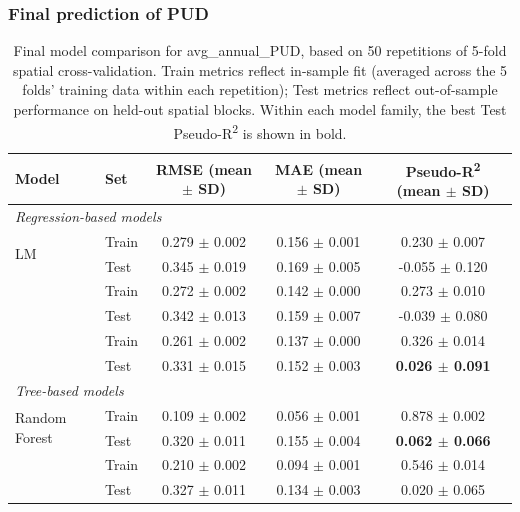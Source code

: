 \documentclass[hidelinks, 11pt]{article}
\begin{document}
\subsubsection{Final prediction of PUD}

\begin{table}[htbp]
\centering
\caption{Final model comparison for avg\_annual\_PUD, based on 50 repetitions of 5-fold spatial cross-validation. Train metrics reflect in-sample fit (averaged across the 5 folds' training data within each repetition); Test metrics reflect out-of-sample performance on held-out spatial blocks. Within each model family, the best Test Pseudo-R\textsuperscript{2} is shown in bold.}
\label{tab:final_model_comparison}
\begin{tabular}{@{}llccc@{}}
\toprule
\textbf{Model} & \textbf{Set} & \textbf{RMSE (mean $\pm$ SD)} & \textbf{MAE (mean $\pm$ SD)} & \textbf{Pseudo-R\textsuperscript{2} (mean $\pm$ SD)} \\
\midrule
\multicolumn{5}{l}{\textit{Regression-based models}} \\
\multirow{2}{*}{LM}  & Train & 0.279 $\pm$ 0.002 & 0.156 $\pm$ 0.001 & 0.230 $\pm$ 0.007 \\
                     & Test  & 0.345 $\pm$ 0.019 & 0.169 $\pm$ 0.005 & -0.055 $\pm$ 0.120 \\
\addlinespace
\multirow{2}{*}{GLM} & Train & 0.272 $\pm$ 0.002 & 0.142 $\pm$ 0.000 & 0.273 $\pm$ 0.010 \\
                     & Test  & 0.342 $\pm$ 0.013 & 0.159 $\pm$ 0.007 & -0.039 $\pm$ 0.080 \\
\addlinespace
\multirow{2}{*}{GAM} & Train & 0.261 $\pm$ 0.002 & 0.137 $\pm$ 0.000 & 0.326 $\pm$ 0.014 \\
                     & Test  & 0.331 $\pm$ 0.015 & 0.152 $\pm$ 0.003 & \textbf{0.026 $\pm$ 0.091} \\
\midrule
\multicolumn{5}{l}{\textit{Tree-based models}} \\
\multirow{2}{*}{Random Forest} & Train & 0.109 $\pm$ 0.002 & 0.056 $\pm$ 0.001 & 0.878 $\pm$ 0.002 \\
                                & Test  & 0.320 $\pm$ 0.011 & 0.155 $\pm$ 0.004 & \textbf{0.062 $\pm$ 0.066} \\
\addlinespace
\multirow{2}{*}{XGBoost} & Train & 0.210 $\pm$ 0.002 & 0.094 $\pm$ 0.001 & 0.546 $\pm$ 0.014 \\
                          & Test  & 0.327 $\pm$ 0.011 & 0.134 $\pm$ 0.003 & 0.020 $\pm$ 0.065 \\
\bottomrule
\end{tabular}
\end{table}
\end{document}
